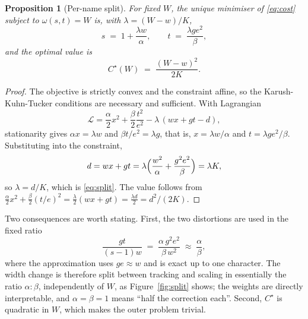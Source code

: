 \documentclass[10pt,twocolumn]{article}
\theoremstyle{plain}
\newtheorem{proposition}{Proposition}
\theoremstyle{definition}
\begin{document}
  \begin{proposition}[Per-name split]
    \label{prop:split}
    For fixed $W$, the unique minimiser of \eqref{eq:cost} subject to $\omega(s,t) = W$ is, with $\lambda = (W - w)/K$,
    \begin{equation}
      s \;=\; 1 + \frac{\lambda w}{\alpha}, \qquad t \;=\; \frac{\lambda g e^2}{\beta},
      \label{eq:split}
    \end{equation}
    and the optimal value is
    \begin{equation}
      C^\star(W) \;=\; \frac{(W - w)^2}{2 K}.
      \label{eq:cstar}
    \end{equation}
  \end{proposition}

  \begin{proof}
    The objective is strictly convex and the constraint affine, so the Karush-Kuhn-Tucker conditions are necessary and sufficient.
    With Lagrangian
    \[
      \mathcal{L} = \frac{\alpha}{2}x^2 + \frac{\beta}{2}\frac{t^2}{e^2} - \lambda\,(w x + g t - d),
    \]
    stationarity gives $\alpha x = \lambda w$ and $\beta t / e^2 = \lambda g$, that is, $x = \lambda w/\alpha$ and $t = \lambda g e^2/\beta$.
    Substituting into the constraint,
    \[
      d = w x + g t = \lambda\Bigl(\frac{w^2}{\alpha} + \frac{g^2 e^2}{\beta}\Bigr) = \lambda K ,
    \]
    so $\lambda = d/K$, which is \eqref{eq:split}.
    The value follows from $\frac{\alpha}{2}x^2 + \frac{\beta}{2}(t/e)^2 = \frac{\lambda}{2}(wx + gt) = \frac{\lambda d}{2} = d^2/(2K)$.
  \end{proof}

  Two consequences are worth stating.
  First, the two distortions are used in the fixed ratio
  \begin{equation}
    \frac{g t}{(s - 1) w} \;=\; \frac{\alpha\, g^2 e^2}{\beta\, w^2} \;\approx\; \frac{\alpha}{\beta} ,
    \label{eq:ratio}
  \end{equation}
  where the approximation uses $g e \approx w$ and is exact up to one character.
  The width change is therefore split between tracking and scaling in essentially the ratio $\alpha : \beta$, independently of $W$, as Figure~\ref{fig:split} shows; the weights are directly interpretable, and $\alpha = \beta = 1$ means ``half the correction each''.
  Second, $C^\star$ is quadratic in $W$, which makes the outer problem trivial.
\end{document}
